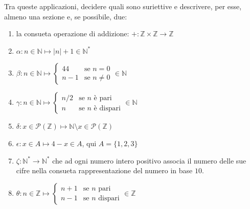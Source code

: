 \begin{exsbox}
	Tra queste applicazioni, decidere quali sono suriettive e descrivere, per esse, almeno una sezione e, se possibile, due:
	\begin{enumerate}
		\item la consueta operazione di addizione: $+: \mathbb{Z} \times \mathbb{Z} \longrightarrow \mathbb{Z}$
		\item $\alpha: n \in \mathbb{N} \mapsto |n|+1 \in \mathbb{N}^{*}$
		\item $\beta: n \in \mathbb{N} \mapsto \begin{cases} 44 & \mbox{se $n=0$} \\ n-1 & \mbox{se $n \neq 0$} \end{cases} \in \mathbb{N}$
		\item $\gamma: n \in \mathbb{N} \mapsto \begin{cases} n/2 & \mbox{se $n$ è pari} \\ n & \mbox{se $n$ è dispari} \end{cases} \in \mathbb{N}$
		\item $\delta: x \in \mathcal{P}(\mathbb{Z}) \mapsto \mathbb{N} \setminus x \in \mathcal{P}(\mathbb{Z})$
		\item $\epsilon: x \in A \mapsto 4-x \in A$, qui $A=\{1,2,3\}$
		\item $\zeta: \mathbb{N}^{*} \longrightarrow \mathbb{N}^{*}$ che ad ogni numero intero positivo associa il numero delle sue cifre nella consueta rappresentazione del numero in base $10$.
		\item $\theta: n \in \mathbb{Z} \mapsto \begin{cases} n+1 & \text{se $n$ pari} \\ n-1 & \text{se $n$ dispari} \end{cases} \in \mathbb{Z}$
	\end{enumerate}
\end{exsbox}

